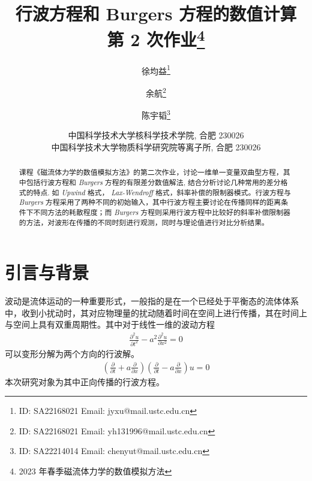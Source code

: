 \documentclass[10.5pt
]{article}
\def\Term{2023 年春季}
\def\Course{磁流体力学的数值模拟方法}
\begin{document}
\title{行波方程和 Burgers 方程的数值计算 \\
  第 2 次作业\footnote{\Term\Course}}

\author{徐均益\footnote{ID: SA22168021 Email: jyxu@mail.ustc.edu.cn}
  \and
  余航\footnote{ID: SA22168021 Email: yh131996@mail.ustc.edu.cn}
  \and
  陈宇韬\footnote{ID: SA22214014 Email: chenyut@mail.ustc.edu.cn}
}

\date{%
\scriptsize%
中国科学技术大学核科学技术学院, 合肥 230026 \\
中国科学技术大学物质科学研究院等离子所, 合肥 230026
%
}


\maketitle

\begin{abstract}
课程《磁流体力学的数值模拟方法》的第二次作业，讨论一维单一变量双曲型方程，其中包括行波方程和 \textit{Burgers} 方程的有限差分数值解法,
结合分析讨论几种常用的差分格式的特点. 如 \textit{Upwind} 格式， \textit{Lax-Wendroff} 格式，斜率补偿的限制器模式。行波方程与 \textit{Burgers} 方程采用了两种不同的初始输入，其中行波方程主要讨论在传播同样的距离条件下不同方法的耗散程度；而 \textit{Burgers} 方程则采用行波方程中比较好的斜率补偿限制器的方法，对波形在传播的不同时刻进行观测，同时与理论值进行对比分析结果。
\end{abstract}

\section{引言与背景}
波动是流体运动的一种重要形式，一般指的是在一个已经处于平衡态的流体体系中，收到小扰动时，其对应物理量的扰动随着时间在空间上进行传播，其在时间上与空间上具有双重周期性。其中对于线性一维的波动方程
\begin{align}
\frac{\partial^2 u}{\partial t^2} - a^2 \frac{\partial^2 u}{\partial x^2} = 0
\label{EqnCon}
\end{align}
可以变形分解为两个方向的行波解。
\begin{align}
\left( \frac{\partial }{\partial t} + a \frac{\partial }{\partial x} \right) \left( \frac{\partial }{\partial t} - a \frac{\partial }{\partial x} \right) u= 0
\end{align}
本次研究对象为其中正向传播的行波方程。
\end{document}
